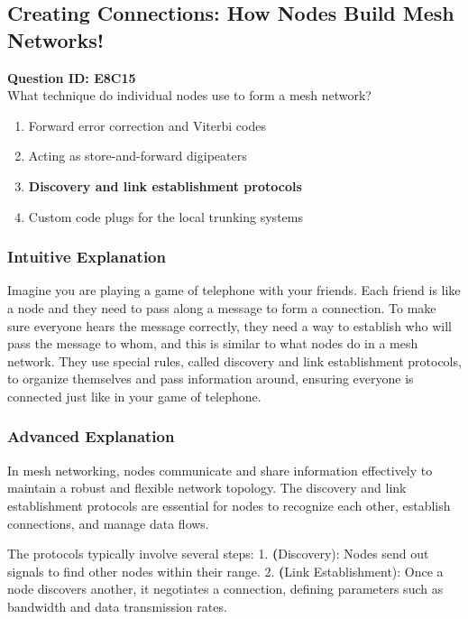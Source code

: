 \subsection{Creating Connections: How Nodes Build Mesh Networks!}

\begin{tcolorbox}
    \textbf{Question ID: E8C15} \\
    What technique do individual nodes use to form a mesh network? 
    \begin{enumerate}[label=\Alph*.]
        \item Forward error correction and Viterbi codes
        \item Acting as store-and-forward digipeaters
        \item \textbf{Discovery and link establishment protocols}
        \item Custom code plugs for the local trunking systems
    \end{enumerate}
\end{tcolorbox}

\subsubsection{Intuitive Explanation}
Imagine you are playing a game of telephone with your friends. Each friend is like a node and they need to pass along a message to form a connection. To make sure everyone hears the message correctly, they need a way to establish who will pass the message to whom, and this is similar to what nodes do in a mesh network. They use special rules, called discovery and link establishment protocols, to organize themselves and pass information around, ensuring everyone is connected just like in your game of telephone.

\subsubsection{Advanced Explanation}
In mesh networking, nodes communicate and share information effectively to maintain a robust and flexible network topology. The discovery and link establishment protocols are essential for nodes to recognize each other, establish connections, and manage data flows. 

The protocols typically involve several steps:
1. \textbf(Discovery): Nodes send out signals to find other nodes within their range.
2. \textbf(Link Establishment): Once a node discovers another, it negotiates a connection, defining parameters such as bandwidth and data transmission rates.

